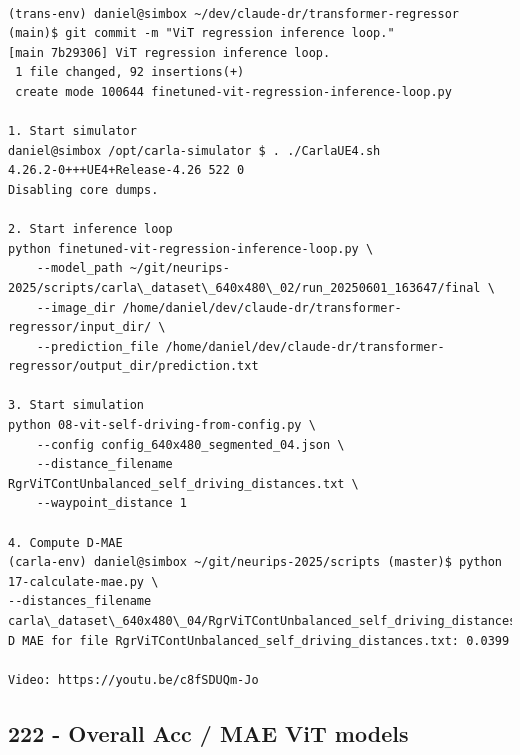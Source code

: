 \begin{verbatim}

(trans-env) daniel@simbox ~/dev/claude-dr/transformer-regressor (main)$ git commit -m "ViT regression inference loop."
[main 7b29306] ViT regression inference loop.
 1 file changed, 92 insertions(+)
 create mode 100644 finetuned-vit-regression-inference-loop.py
 
1. Start simulator
daniel@simbox /opt/carla-simulator $ . ./CarlaUE4.sh 
4.26.2-0+++UE4+Release-4.26 522 0
Disabling core dumps.

2. Start inference loop
python finetuned-vit-regression-inference-loop.py \
    --model_path ~/git/neurips-2025/scripts/carla\_dataset\_640x480\_02/run_20250601_163647/final \
    --image_dir /home/daniel/dev/claude-dr/transformer-regressor/input_dir/ \
    --prediction_file /home/daniel/dev/claude-dr/transformer-regressor/output_dir/prediction.txt

3. Start simulation
python 08-vit-self-driving-from-config.py \
    --config config_640x480_segmented_04.json \
    --distance_filename RgrViTContUnbalanced_self_driving_distances.txt \
    --waypoint_distance 1

4. Compute D-MAE
(carla-env) daniel@simbox ~/git/neurips-2025/scripts (master)$ python 17-calculate-mae.py \
--distances_filename carla\_dataset\_640x480\_04/RgrViTContUnbalanced_self_driving_distances.txt
D MAE for file RgrViTContUnbalanced_self_driving_distances.txt: 0.0399

Video: https://youtu.be/c8fSDUQm-Jo

\end{verbatim}

\subsection{222 - Overall Acc / MAE ViT models}
\label{app_res:222}

